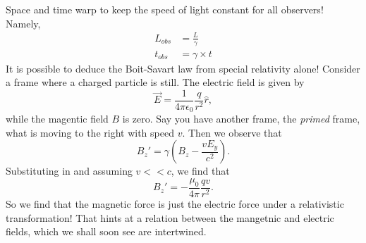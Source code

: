 \documentclass[nobib]{tufte-handout}
\begin{document}
Space and time warp to keep the speed of light constant 
for all observers! Namely, 
\begin{align}
    L_{obs} &= \frac{L}{\gamma} \\
    t_{obs} &= \gamma \times t 
\end{align}
It is possible to deduce the Boit-Savart law from special 
relativity alone! Consider a frame where a charged particle is still. 
The electric field is given by 
\[\vec{E} = \frac{1}{4 \pi \epsilon_0} \frac{q}{r^2} \hat{r},\]
while the magentic field $B$ is zero. Say you have another frame, 
the \emph{primed} frame, what is moving to the right with speed $v$. 
Then we observe that 
\[B_z' = \gamma (B_z - \frac{v E_y}{c^2}).\]
Substituting in and assuming $v << c$, we find that 
\[B_z' =  -\frac{\mu_0}{4 \pi} \frac{qv}{r^2}.\]
So we find that the magnetic force is just the electric force under 
a relativistic transformation! That hints at a relation between the mangetnic 
and electric fields, which we shall soon see are intertwined. 
\end{document}
